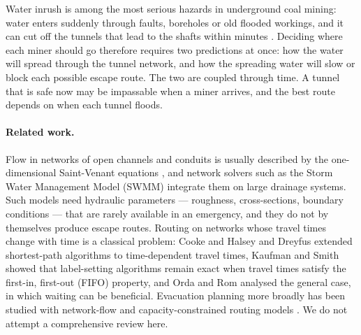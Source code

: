 \documentclass[11pt,a4paper]{article}
\theoremstyle{plain}
\theoremstyle{definition}
\theoremstyle{remark}
\begin{document}
Water inrush is among the most serious hazards in underground coal mining: water enters suddenly through faults, boreholes or old flooded workings, and it can cut off the tunnels that lead to the shafts within minutes \cite{guo}. Deciding where each miner should go therefore requires two predictions at once: how the water will spread through the tunnel network, and how the spreading water will slow or block each possible escape route. The two are coupled through time. A tunnel that is safe now may be impassable when a miner arrives, and the best route depends on when each tunnel floods.

\paragraph{Related work.} Flow in networks of open channels and conduits is usually described by the one-dimensional Saint-Venant equations \cite{chow, cunge}, and network solvers such as the Storm Water Management Model (SWMM) \cite{swmm} integrate them on large drainage systems. Such models need hydraulic parameters --- roughness, cross-sections, boundary conditions --- that are rarely available in an emergency, and they do not by themselves produce escape routes. Routing on networks whose travel times change with time is a classical problem: Cooke and Halsey \cite{cooke} and Dreyfus \cite{dreyfus} extended shortest-path algorithms to time-dependent travel times, Kaufman and Smith \cite{kaufman} showed that label-setting algorithms remain exact when travel times satisfy the first-in, first-out (FIFO) property, and Orda and Rom \cite{orda} analysed the general case, in which waiting can be beneficial. Evacuation planning more broadly has been studied with network-flow and capacity-constrained routing models \cite{hamacher, lu}. We do not attempt a comprehensive review here.
\end{document}
